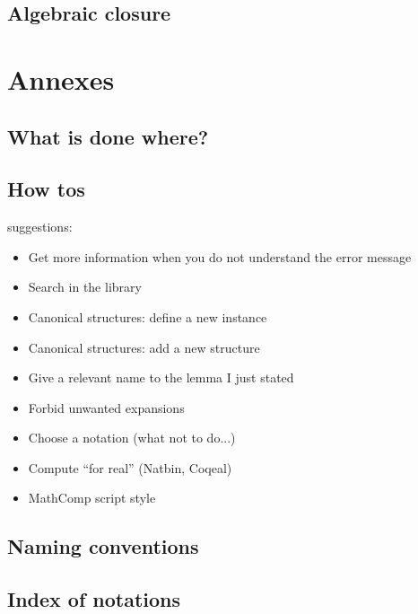 \documentclass{book}
\begin{document}
\chapter{Algebraic closure}

\part{Annexes}

\chapter{What is done where?}

\chapter{How tos}
suggestions:
\begin{itemize}
\item Get more information when you do not understand the error
  message
\item Search in the library
\item Canonical structures: define a new instance
\item Canonical structures: add a new structure
\item Give a relevant name to the lemma I just stated
\item Forbid unwanted expansions
\item Choose a notation (what not to do...)
\item Compute ``for real'' (Natbin, Coqeal)
\item MathComp script style
\end{itemize}
\chapter{Naming conventions}

\chapter{Index of notations}
\end{document}
